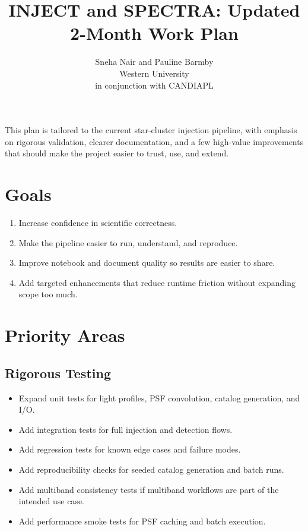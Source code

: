 \documentclass[11pt]{article}
\title{INJECT and SPECTRA: Updated 2-Month Work Plan}
\author{Sneha Nair and Pauline Barmby\\Western University\\in conjunction with CANDIAPL}
\date{}
\begin{document}
\maketitle

\noindent This plan is tailored to the current star-cluster injection pipeline, with emphasis on rigorous validation, clearer documentation, and a few high-value improvements that should make the project easier to trust, use, and extend.

\section{Goals}

\begin{enumerate}
    \item Increase confidence in scientific correctness.
    \item Make the pipeline easier to run, understand, and reproduce.
    \item Improve notebook and document quality so results are easier to share.
    \item Add targeted enhancements that reduce runtime friction without expanding scope too much.
\end{enumerate}

\section{Priority Areas}

\subsection{Rigorous Testing}

\begin{itemize}
    \item Expand unit tests for light profiles, PSF convolution, catalog generation, and I/O.
    \item Add integration tests for full injection and detection flows.
    \item Add regression tests for known edge cases and failure modes.
    \item Add reproducibility checks for seeded catalog generation and batch runs.
    \item Add multiband consistency tests if multiband workflows are part of the intended use case.
    \item Add performance smoke tests for PSF caching and batch execution.
\end{itemize}
\end{document}
